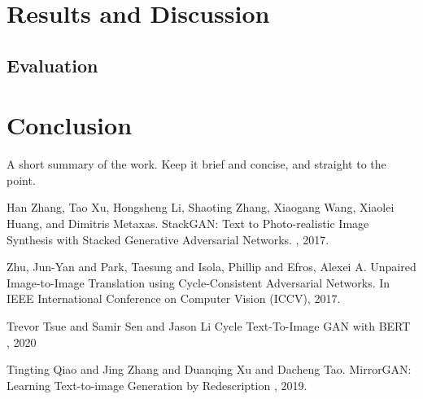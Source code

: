 \documentclass{article}
\begin{document}
	\section{Results and Discussion}
	

	\subsection{Evaluation}	


	\section{Conclusion}

	    A short summary of the work. Keep it brief and concise, and straight to the point.


	  
	
	
	\begin{thebibliography}{1}
		Han Zhang, Tao Xu, Hongsheng Li, Shaoting Zhang, Xiaogang Wang, Xiaolei Huang, and 
		Dimitris Metaxas.
		\newblock StackGAN: Text to Photo-realistic Image Synthesis with Stacked 
		Generative Adversarial Networks.
		, 2017.
		

		Zhu, Jun-Yan and Park, Taesung and Isola, Phillip and Efros, Alexei A.
		\newblock Unpaired Image-to-Image Translation using Cycle-Consistent Adversarial Networks.
		\newblock In IEEE International Conference on Computer Vision (ICCV), 2017.

		Trevor Tsue and Samir Sen and Jason Li
		\newblock Cycle Text-To-Image GAN with BERT
		, 2020
		
		Tingting Qiao and Jing Zhang and Duanqing Xu and Dacheng Tao.
		\newblock MirrorGAN: Learning Text-to-image Generation by Redescription
		, 2019.
		
	\end{thebibliography}
	
	
\end{document}
